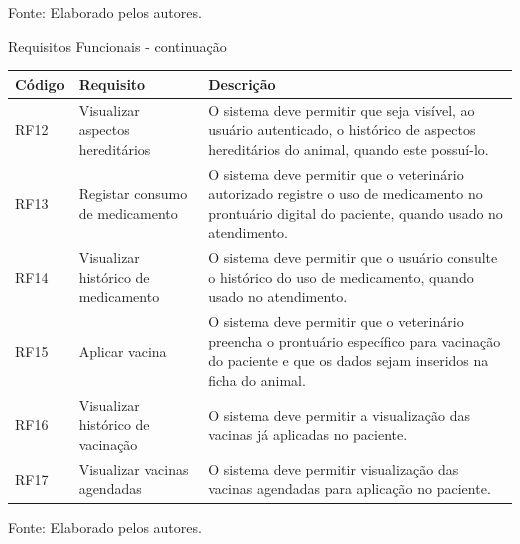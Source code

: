 \documentclass[
    12pt,               %
    openright,          %
    oneside,
    a4paper,            %
    BIBLATEX,           %
    TODO,               %
    english,            %
    brazil              %
    ]{ifsp-spo-inf-ctds}
\begin{document}
\begin{center}
\begin{quadro}[H]
\begin{tabulary}{1.0\textwidth}{|p{5em}|p{8em}|p{18em}|}
                \end{tabulary}
                \label{tab:req_func}
                \centering
                
                \footnotesize {Fonte: Elaborado pelos autores.}
                \end{quadro}
            \end{center}   

            \begin{center}
                \begin{quadro}[h]
                \caption{Requisitos Funcionais - continuação}
                \begin{tabulary}{1.0\textwidth}{|p{5em}|p{8em}|p{18em}|}
                \hline
                Código & Requisito & Descrição\\
                \hline
                RF12 & Visualizar aspectos hereditários & O sistema deve permitir que seja visível, ao usuário autenticado, o histórico de aspectos hereditários do animal, quando este possuí-lo.\\
                \hline
                RF13 & Registar consumo de medicamento & O sistema deve permitir que o veterinário autorizado registre o uso de medicamento no prontuário digital do paciente, quando usado no atendimento.\\
                \hline
                RF14 & Visualizar histórico de medicamento & O sistema deve permitir que o usuário consulte o histórico do uso de medicamento, quando usado no atendimento.\\
                \hline
                RF15 & Aplicar vacina & O sistema deve permitir que o veterinário preencha o prontuário específico para vacinação do paciente e que os dados sejam inseridos na ficha do animal.\\
                \hline
                RF16 & Visualizar histórico de vacinação & O sistema deve permitir a visualização das vacinas já aplicadas no paciente.\\
                \hline
                RF17 & Visualizar vacinas agendadas & O sistema deve permitir visualização das vacinas agendadas para aplicação no paciente.\\
                \hline
                \end{tabulary}
                \label{tab:req_func2}
                \centering
                
                \footnotesize {Fonte: Elaborado pelos autores.}
                \end{quadro}
            \end{center}
\end{document}
